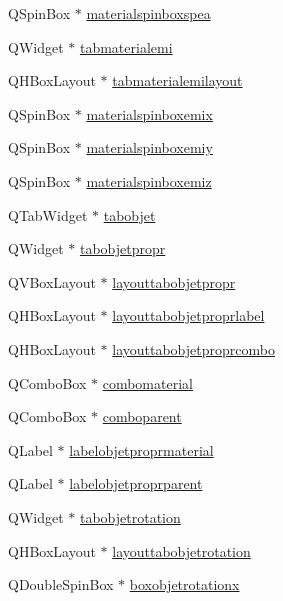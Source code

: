 \begin{DoxyCompactItemize}
Q\+Spin\+Box $\ast$ \hyperlink{class_mondock_a62de223ddabe875e9406fd43b892a8a0}{materialspinboxspea}
\item 
Q\+Widget $\ast$ \hyperlink{class_mondock_af4e2b3e87db243b8813a3e71cbf9dd7d}{tabmaterialemi}
\item 
Q\+H\+Box\+Layout $\ast$ \hyperlink{class_mondock_afc37221d5733642eeeeaf93042d72dcb}{tabmaterialemilayout}
\item 
Q\+Spin\+Box $\ast$ \hyperlink{class_mondock_a003c7eff97a356c6dc6d7f892719e91f}{materialspinboxemix}
\item 
Q\+Spin\+Box $\ast$ \hyperlink{class_mondock_a92982a92a14d612a49dd027cb68b6d73}{materialspinboxemiy}
\item 
Q\+Spin\+Box $\ast$ \hyperlink{class_mondock_ab95fca34ebe4db052bab4109eaf5afd1}{materialspinboxemiz}
\item 
Q\+Tab\+Widget $\ast$ \hyperlink{class_mondock_a3f12af44327a1739e8818ee91649ebbf}{tabobjet}
\item 
Q\+Widget $\ast$ \hyperlink{class_mondock_adc331c4d8373b45e636757e12a2bd5a0}{tabobjetpropr}
\item 
Q\+V\+Box\+Layout $\ast$ \hyperlink{class_mondock_ac56ddde4fb8bc59837027ed14f8b19d8}{layouttabobjetpropr}
\item 
Q\+H\+Box\+Layout $\ast$ \hyperlink{class_mondock_a933e33341a7ad640413b19c6d811559a}{layouttabobjetproprlabel}
\item 
Q\+H\+Box\+Layout $\ast$ \hyperlink{class_mondock_a666eed2f58369dbaea12c10c9c5f4888}{layouttabobjetproprcombo}
\item 
Q\+Combo\+Box $\ast$ \hyperlink{class_mondock_ab8773b4c45e6e0e13a9bb22793e3c870}{combomaterial}
\item 
Q\+Combo\+Box $\ast$ \hyperlink{class_mondock_a32ebd1f643a5f1b9749eb4f9d4940973}{comboparent}
\item 
Q\+Label $\ast$ \hyperlink{class_mondock_ac49c211334c5b4502c99dc47ff86fe1c}{labelobjetproprmaterial}
\item 
Q\+Label $\ast$ \hyperlink{class_mondock_a4d76ec3b85d44b07f7147f5b2a7c68a7}{labelobjetproprparent}
\item 
Q\+Widget $\ast$ \hyperlink{class_mondock_a917509c60bf1cd3eff74b0bd9c606dae}{tabobjetrotation}
\item 
Q\+H\+Box\+Layout $\ast$ \hyperlink{class_mondock_ab36da4ccb733ba45b30be8c325a593d9}{layouttabobjetrotation}
\item 
Q\+Double\+Spin\+Box $\ast$ \hyperlink{class_mondock_accc1854d02d6d2a0b61297b351bd196a}{boxobjetrotationx}

\end{DoxyCompactItemize}
